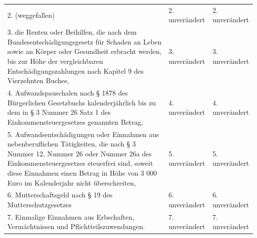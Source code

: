 \documentclass[10pt,a4paper,landscape]{article}
\begin{document}
\begin{longtable}{|L{8.2cm}|L{8.2cm}|L{8.2cm}|}
\hhline{|---|}
2.   \newline (weggefallen) & 2. unverändert & 2. unverändert \\
\hhline{|---|}
3.   \newline die Renten oder Beihilfen, die nach dem  \newline Bundesentschädigungsgesetz für Schaden  \newline an Leben sowie an Körper oder  \newline Gesundheit erbracht werden, bis zur Höhe  \newline der vergleichbaren  \newline Entschädigungszahlungen nach Kapitel 9  \newline des Vierzehnten Buches, & 3. unverändert & 3. unverändert \\
\hhline{|---|}
4.   \newline Aufwandspauschalen nach \S{} 1878 des  \newline Bürgerlichen Gesetzbuchs kalenderjährlich  \newline bis zu dem in \S{} 3 Nummer 26 Satz 1 des  \newline Einkommensteuergesetzes genannten  \newline Betrag, & 4. unverändert & 4. unverändert \\
\hhline{|---|}
5.  \newline Aufwandsentschädigungen oder  \newline Einnahmen aus nebenberuflichen  \newline Tätigkeiten, die nach \S{} 3 Nummer 12,  \newline Nummer 26 oder Nummer 26a des  \newline Einkommensteuergesetzes steuerfrei sind,  \newline soweit diese Einnahmen einen Betrag in  \newline Höhe von 3 000 Euro im Kalenderjahr nicht  \newline überschreiten, & 5. unverändert & 5. unverändert \\
\hhline{|---|}
6.   \newline Mutterschaftsgeld nach \S{} 19 des  \newline Mutterschutzgesetzes & 6. unverändert & 6. unverändert \\
\hhline{|---|}
7.   \newline Einmalige Einnahmen aus Erbschaften,  \newline Vermächtnissen und  \newline Pflichtteilszuwendungen. & 7. unverändert & 7. unverändert \\

\end{longtable}
\end{document}
